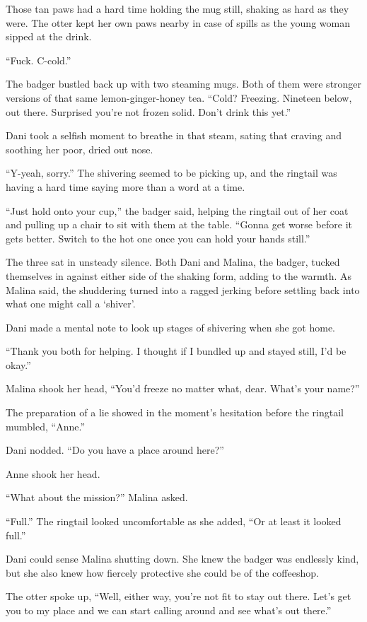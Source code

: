 Those tan paws had a hard time holding the mug still, shaking as hard as they were. The otter kept her own paws nearby in case of spills as the young woman sipped at the drink.

``Fuck. C-cold.''

The badger bustled back up with two steaming mugs. Both of them were stronger versions of that same lemon-ginger-honey tea. ``Cold? Freezing. Nineteen below, out there. Surprised you're not frozen solid. Don't drink this yet.''

Dani took a selfish moment to breathe in that steam, sating that craving and soothing her poor, dried out nose.

``Y-yeah, sorry.'' The shivering seemed to be picking up, and the ringtail was having a hard time saying more than a word at a time.

``Just hold onto your cup,'' the badger said, helping the ringtail out of her coat and pulling up a chair to sit with them at the table. ``Gonna get worse before it gets better. Switch to the hot one once you can hold your hands still.''

The three sat in unsteady silence. Both Dani and Malina, the badger, tucked themselves in against either side of the shaking form, adding to the warmth. As Malina said, the shuddering turned into a ragged jerking before settling back into what one might call a `shiver'.

Dani made a mental note to look up stages of shivering when she got home.

``Thank you both for helping. I thought if I bundled up and stayed still, I'd be okay.''

Malina shook her head, ``You'd freeze no matter what, dear. What's your name?''

The preparation of a lie showed in the moment's hesitation before the ringtail mumbled, ``Anne.''

Dani nodded. ``Do you have a place around here?''

Anne shook her head.

``What about the mission?'' Malina asked.

``Full.'' The ringtail looked uncomfortable as she added, ``Or at least it looked full.''

Dani could sense Malina shutting down. She knew the badger was endlessly kind, but she also knew how fiercely protective she could be of the coffeeshop.

The otter spoke up, ``Well, either way, you're not fit to stay out there. Let's get you to my place and we can start calling around and see what's out there.''

